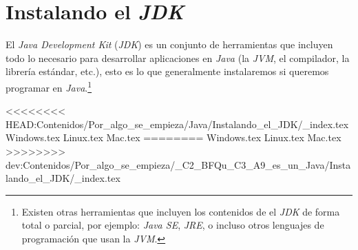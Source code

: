\section{Instalando el \textit{JDK}}
  El \textit{Java Development Kit} (\textit{JDK}) es un conjunto de herramientas que incluyen 
  todo lo necesario para desarrollar aplicaciones en \textit{Java} (la \textit{JVM}, el 
  compilador, la librería estándar, etc.), esto es lo que generalmente instalaremos si queremos
  programar en \textit{Java}.\footnote{Existen otras herramientas que incluyen los contenidos de 
  el \textit{JDK} de forma total o parcial, por ejemplo: \textit{Java SE}, \textit{JRE}, o 
  incluso otros lenguajes de programación que usan la \textit{JVM}.}

<<<<<<<< HEAD:Contenidos/Por_algo_se_empieza/Java/Instalando_el_JDK/_index.tex
  {Windows.tex}
  {Linux.tex}
  {Mac.tex}
========
  {Windows.tex}
  {Linux.tex}
  {Mac.tex}
>>>>>>>> dev:Contenidos/Por_algo_se_empieza/_C2_BFQu_C3_A9_es_un_Java/Instalando_el_JDK/_index.tex
